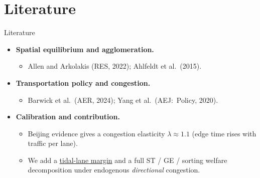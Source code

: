 \documentclass[11pt,aspectratio=169]{beamer}
\begin{document}
\section{Literature}
\begin{frame}{Literature}
\begin{itemize}
  \item \textbf{Spatial equilibrium and agglomeration.}
  \begin{itemize}\footnotesize
    \item Allen and Arkolakis (RES, 2022); Ahlfeldt et al.\ (2015).
  \end{itemize}
  \item \textbf{Transportation policy and congestion.}
  \begin{itemize}\footnotesize
    \item Barwick et al.\ (AER, 2024); Yang et al.\ (AEJ:\ Policy, 2020).
  \end{itemize}
  \item \textbf{Calibration and contribution.}
  \begin{itemize}\footnotesize
    \item Beijing evidence gives a congestion elasticity $\lambda\approx1.1$ (edge time rises with traffic per lane).
    \item We add a \underline{tidal-lane margin} and a full ST / GE / sorting welfare decomposition under endogenous \emph{directional} congestion.
  \end{itemize}
\end{itemize}
\end{frame}

\end{document}
